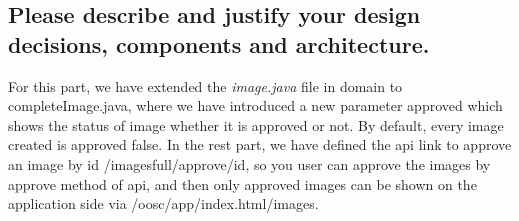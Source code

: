 \subsection{Please describe and justify your design decisions, components and
architecture.}

For this part, we have extended the \textit{image.java} file in domain to completeImage.java, where we have introduced a new parameter approved which  shows the status of image whether it is approved or not. By default, every image created  is approved false. In the rest part, we  have defined the api link to approve an image by id /imagesfull/approve/{id}, so you user can approve the images by approve method of api, and then only approved images can be shown on the application side via /oosc/app/index.html/images.